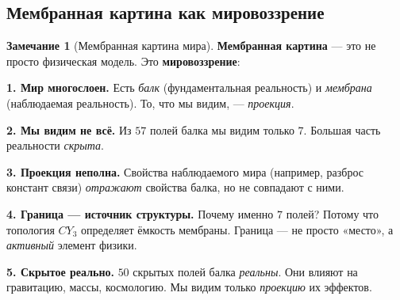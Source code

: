 \documentclass[11pt,a4paper]{article}
\newcommand{\CY}{CY_3}
\theoremstyle{definition}
\newtheorem{remark}[theorem]{Замечание}
\begin{document}
\subsection{Мембранная картина как мировоззрение}
\label{subsec:membrane-worldview}

\begin{remark}[Мембранная картина мира]
\label{rem:membrane-worldview}
\textbf{Мембранная картина} — это не просто физическая модель. 
Это \textbf{мировоззрение}:

\medskip\noindent
\textbf{1. Мир многослоен.}
Есть \emph{балк} (фундаментальная реальность) и \emph{мембрана} 
(наблюдаемая реальность). То, что мы видим, — \emph{проекция}.

\medskip\noindent
\textbf{2. Мы видим не всё.}
Из $57$ полей балка мы видим только $7$. Большая часть 
реальности \emph{скрыта}.

\medskip\noindent
\textbf{3. Проекция неполна.}
Свойства наблюдаемого мира (например, разброс констант связи) 
\emph{отражают} свойства балка, но не совпадают с ними.

\medskip\noindent
\textbf{4. Граница — источник структуры.}
Почему именно $7$ полей? Потому что топология $\CY$ определяет 
ёмкость мембраны. Граница — не просто «место», а 
\emph{активный} элемент физики.

\medskip\noindent
\textbf{5. Скрытое реально.}
$50$ скрытых полей балка \emph{реальны}. Они влияют на 
гравитацию, массы, космологию. Мы видим только \emph{проекцию} 
их эффектов.
\end{remark}
\end{document}
